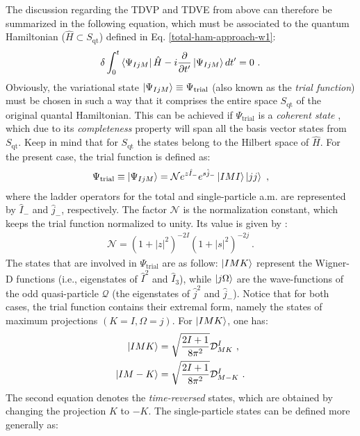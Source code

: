 The discussion regarding the TDVP and TDVE from above can therefore be summarized in the following equation, which must be associated to the quantum Hamiltonian ($\hat{H}\subset S_\text{qt}$) defined in Eq. \ref{total-ham-approach-w1}:
\begin{align}
    \delta\int_0^t\bra{\Psi_{IjM}}\hat{H}-i\frac{\partial}{\partial t'}\ket{\Psi_{IjM}}dt'=0\ .
    \label{tdve-approach-w1}
\end{align}
Obviously, the variational state $\ket{\Psi_{IjM}}\equiv\Psi_\text{trial}$ (also known as the \emph{trial function}) must be chosen in such a way that it comprises the entire space $S_\text{qt}$ of the original quantal Hamiltonian. This can be achieved if $\Psi_\text{trial}$ is a \emph{coherent state} \cite{glauber1963coherent}, which due to its \emph{completeness} property will span all the basis vector states from $S_\text{qt}$. Keep in mind that for $S_\text{qt}$ the states belong to the Hilbert space of $\hat{H}$. For the present case, the trial function is defined as:
\begin{align}
    \Psi_\text{trial}\equiv\ket{\Psi_{IjM}}=\mathcal{N}e^{z\hat{I}_-}e^{s\hat{j}_-}\ket{IMI}\ket{jj}\ ,
    \label{trial-function-appeoach-w1}
\end{align}
where the ladder operators for the total and single-particle a.m. are represented by $\hat{I}_-$ and $\hat{j}_-$, respectively. The factor $\mathcal{N}$ is the normalization constant, which keeps the trial function normalized to unity. Its value is given by \cite{raduta2007semiclassical,raduta2020new}:
\begin{align}
    \mathcal{N}=\left(1+|z|^2\right)^{-2I}\left(1+|s|^2\right)^{-2j}\ .
\end{align}
The states that are involved in $\Psi_\text{trial}$ are as follow: $\ket{IMK}$ represent the Wigner-D functions (i.e., eigenstates of $\hat{I}^2$ and $\hat{I}_3$), while $\ket{j\Omega}$ are the wave-functions of the odd quasi-particle $\mathcal{Q}$ (the eigenstates of $\hat{j}^2$ and $\hat{j}_-$). Notice that for both cases, the trial function contains their extremal form, namely the states of maximum projections $(K=I,\Omega=j)$. For $\ket{IMK}$, one has:
\begin{align}
    \ket{IMK}&=\sqrt{\frac{2I+1}{8\pi^2}}\mathcal{D}_{MK}^I\ , \nonumber\\
    \ket{IM-K}&=\sqrt{\frac{2I+1}{8\pi^2}}\mathcal{D}_{M-K}^I\ .
    \label{IMK-wigner-functions}
\end{align}
The second equation denotes the \emph{time-reversed} states, which are obtained by changing the projection $K$ to $-K$. The single-particle states can be defined more generally as:
